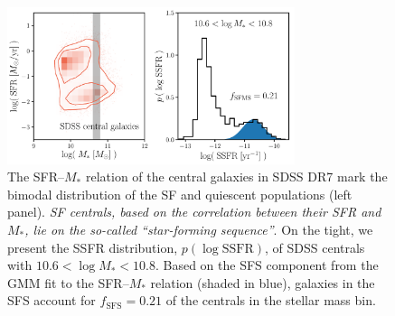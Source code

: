 \documentclass[12pt, letterpaper, preprint, tighten]{aastex62}
\begin{document}

\begin{figure}
\begin{center}
\includegraphics[width=0.75\textwidth]{figs/groupcat.pdf}
    \caption{The SFR--$M_*$ relation of the central galaxies in SDSS DR7
    mark the bimodal distribution of the SF and quiescent populations (left panel). 
    \emph{SF centrals, based on the correlation between their
    SFR and $M_*$, lie on the so-called ``star-forming sequence''}.
    On the tight, we present the SSFR distribution, $p(\log\mathrm{SSFR})$,
    of SDSS centrals with $10.6 < \log M_* < 10.8$. Based on the SFS component
    from the \cite{hahn2018a} GMM fit to the SFR--$M_*$ relation (shaded in blue),
    galaxies in the SFS account for $f_\mathrm{SFS} = 0.21$ of the centrals
    in the stellar mass bin.} \label{fig:groupcat}
\end{center}
\end{figure}
\end{document}
